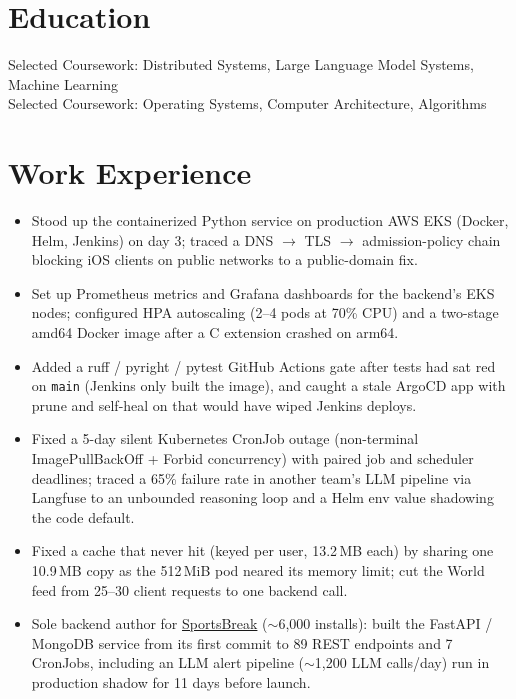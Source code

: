 \documentclass[11pt, letterpaper]{article}
\begin{document}

\section{Education}
Selected Coursework: Distributed Systems, Large Language Model Systems, Machine Learning\\[1pt]
Selected Coursework: Operating Systems, Computer Architecture, Algorithms

\section{Work Experience}
\begin{itemize}
  \item Stood up the containerized Python service on production AWS EKS (Docker, Helm, Jenkins) on day 3; traced a DNS $\to$ TLS $\to$ admission-policy chain blocking iOS clients on public networks to a public-domain fix.
  \item Set up Prometheus metrics and Grafana dashboards for the backend's EKS nodes; configured HPA autoscaling (2--4 pods at 70\% CPU) and a two-stage amd64 Docker image after a C extension crashed on arm64.
  \item Added a ruff / pyright / pytest GitHub Actions gate after tests had sat red on \texttt{main} (Jenkins only built the image), and caught a stale ArgoCD app with prune and self-heal on that would have wiped Jenkins deploys.
  \item Fixed a 5-day silent Kubernetes CronJob outage (non-terminal ImagePullBackOff + Forbid concurrency) with paired job and scheduler deadlines; traced a 65\% failure rate in another team's LLM pipeline via Langfuse to an unbounded reasoning loop and a Helm env value shadowing the code default.
  \item Fixed a cache that never hit (keyed per user, 13.2\,MB each) by sharing one 10.9\,MB copy as the 512\,MiB pod neared its memory limit; cut the World feed from 25--30 client requests to one backend call.
  \item Sole backend author for \href{https://apps.apple.com/app/id6762649287}{SportsBreak} ($\sim$6{,}000 installs): built the FastAPI / MongoDB service from its first commit to 89 REST endpoints and 7 CronJobs, including an LLM alert pipeline ($\sim$1{,}200 LLM calls/day) run in production shadow for 11 days before launch.
\end{itemize}
\end{document}
